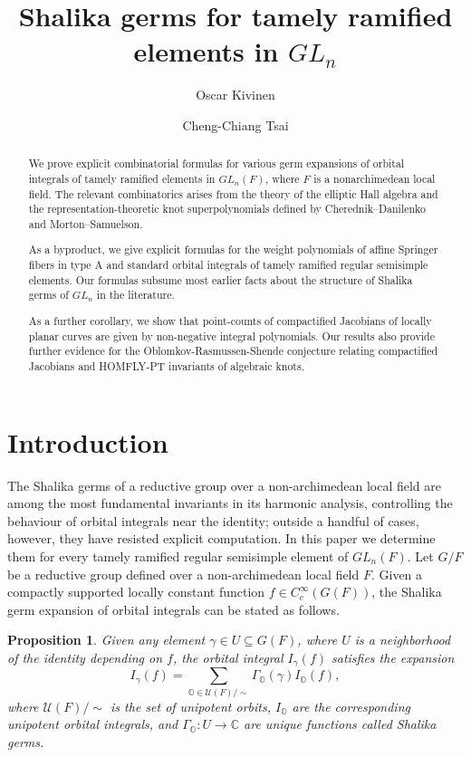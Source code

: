 \documentclass{amsart}
\numberwithin{equation}{section}
\newtheorem{proposition}[lemma]{Proposition}%
\theoremstyle{definition}
\newcommand{\cU}{\mathcal{U}}
\newcommand{\bO}{\mathbb{O}}
\newcommand{\C}{{\mathbb C}}
\begin{document}
\title{Shalika germs for tamely ramified elements in $GL_n$}
\author{Oscar Kivinen}
\address{Aalto University}
\author{Cheng-Chiang Tsai}
\address{Academia Sinica and NSYSU}




\begin{abstract}
We prove explicit combinatorial formulas for various germ expansions of orbital integrals of tamely ramified elements in $GL_n(F)$, where $F$ is a nonarchimedean local field. The relevant combinatorics arises from the theory of the elliptic Hall algebra and the representation-theoretic knot superpolynomials defined by Cherednik--Danilenko and Morton--Samuelson. 

As a byproduct, we give explicit formulas for the weight polynomials of affine Springer fibers in type A and standard orbital integrals of tamely ramified regular semisimple elements. Our formulas subsume most earlier facts about the structure of Shalika germs of $GL_n$ in the literature.

As a further corollary, we show that point-counts of compactified Jacobians of locally planar curves are given by non-negative integral polynomials. Our results also provide further evidence for the Oblomkov-Rasmussen-Shende conjecture relating compactified Jacobians and HOMFLY-PT invariants of algebraic knots.



\end{abstract}

\maketitle 
\tableofcontents
\section{Introduction}
The Shalika germs of a reductive group over a non-archimedean local field are among the most fundamental invariants in its harmonic analysis, controlling the behaviour of orbital integrals near the identity; outside a handful of cases, however, they have resisted explicit computation. In this paper we determine them for every tamely ramified regular semisimple element of $GL_n(F)$. 
Let $G/F$ be a reductive group defined over a non-archimedean local field $F$. Given a compactly supported locally constant function $f\in C^\infty_c(G(F))$, the Shalika germ expansion of orbital integrals \cite{DeBacker, Shalika} can be stated as follows.
\begin{proposition}\label{prop:Shalika}
Given any element $\gamma\in U\subseteq G(F)$, where $U$ is a neighborhood of the identity depending on $f$, the orbital integral $I_\gamma(f)$ satisfies the expansion
$$I_\gamma(f)=\sum_{\bO\in \mathcal{U}(F)/\sim}\Gamma_\bO(\gamma)I_\bO(f),$$
where $\cU(F)/\sim$ is the set of unipotent orbits, $I_\bO$ are the corresponding unipotent orbital integrals, and $\Gamma_\bO: U \to \C$ are unique functions called Shalika germs.
\end{proposition}
\end{document}
